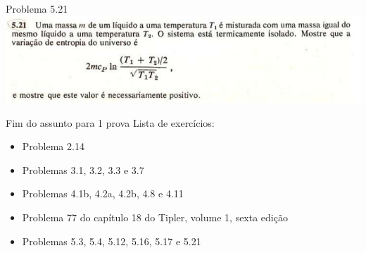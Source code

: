 \documentclass[t,%
brazilian,%
11pt,%
aspectratio=169,%
table%
]{beamer}
\newcommand{\esima}{\textordfeminine }
\begin{document}
\begin{frame}{Problema 5.21}
    \centering
    \includegraphics[width=\textwidth]{images/Captura de tela de 2025-04-29 08-54-57.png}
\end{frame}

\begin{frame}{Fim do assunto para 1\esima{} prova}
    Lista de exercícios:
    \begin{itemize}
        \item Problema 2.14
        \item Problemas 3.1, 3.2, 3.3 e 3.7
        \item Problemas 4.1b, 4.2a, 4.2b, 4.8 e 4.11
        \item Problema 77 do capítulo 18 do Tipler, volume 1, sexta edição
        \item Problemas 5.3, 5.4, 5.12, 5.16, 5.17 e 5.21
    \end{itemize}
\end{frame}
\end{document}
